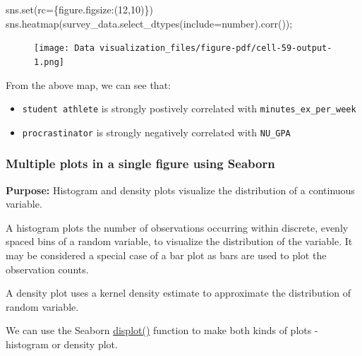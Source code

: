 \documentclass[
  letterpaper,
  DIV=11,
  numbers=noendperiod]{scrreprt}
\newenvironment{Shaded}{\begin{snugshade}}{\end{snugshade}}
\newcommand{\BuiltInTok}[1]{\textcolor[rgb]{0.00,0.23,0.31}{#1}}
\newcommand{\DecValTok}[1]{\textcolor[rgb]{0.68,0.00,0.00}{#1}}
\newcommand{\NormalTok}[1]{\textcolor[rgb]{0.00,0.23,0.31}{#1}}
\newcommand{\OperatorTok}[1]{\textcolor[rgb]{0.37,0.37,0.37}{#1}}
\newcommand{\StringTok}[1]{\textcolor[rgb]{0.13,0.47,0.30}{#1}}
\providecommand{\tightlist}{%
  \setlength{\itemsep}{0pt}\setlength{\parskip}{0pt}}\usepackage{longtable,booktabs,array}
\begin{document}
\begin{Shaded}
\begin{Highlighting}[]
\NormalTok{sns.}\BuiltInTok{set}\NormalTok{(rc}\OperatorTok{=}\NormalTok{\{}\StringTok{\textquotesingle{}figure.figsize\textquotesingle{}}\NormalTok{:(}\DecValTok{12}\NormalTok{,}\DecValTok{10}\NormalTok{)\})}
\NormalTok{sns.heatmap(survey\_data.select\_dtypes(include}\OperatorTok{=}\StringTok{\textquotesingle{}number\textquotesingle{}}\NormalTok{).corr())}\OperatorTok{;}
\end{Highlighting}
\end{Shaded}

\begin{figure}[H]

{\centering \texttt{[image: Data visualization\_files/figure-pdf/cell-59-output-1.png]}

}

\end{figure}

From the above map, we can see that:

\begin{itemize}
\tightlist
\item
  \texttt{student\ athlete} is strongly postively correlated with
  \texttt{minutes\_ex\_per\_week}
\item
  \texttt{procrastinator} is strongly negatively correlated with
  \texttt{NU\_GPA}
\end{itemize}

\hypertarget{multiple-plots-in-a-single-figure-using-seaborn}{%
\subsubsection{Multiple plots in a single figure using
Seaborn}\label{multiple-plots-in-a-single-figure-using-seaborn}}

\textbf{Purpose:} Histogram and density plots visualize the distribution
of a continuous variable.

A histogram plots the number of observations occurring within discrete,
evenly spaced bins of a random variable, to visualize the distribution
of the variable. It may be considered a special case of a bar plot as
bars are used to plot the observation counts.

A density plot uses a kernel density estimate to approximate the
distribution of random variable.

We can use the Seaborn
\href{https://seaborn.pydata.org/generated/seaborn.histplot.html}{displot()}
function to make both kinds of plots - histogram or density plot.
\end{document}
